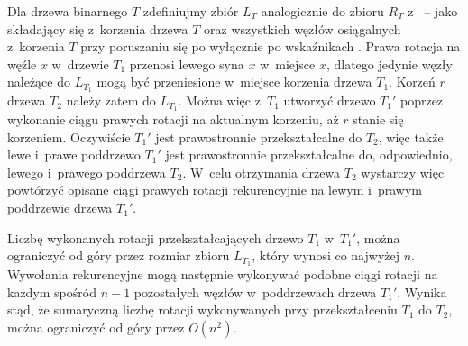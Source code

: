 Dla drzewa binarnego $T$ zdefiniujmy zbiór $L_T$ analogicznie do zbioru $R_T$ z~ -- jako składający się z~korzenia drzewa $T$ oraz wszystkich węzłów osiągalnych z~korzenia $T$ przy poruszaniu się po wyłącznie po wskaźnikach .
Prawa rotacja na węźle $x$ w~drzewie $T_1$ przenosi lewego syna $x$ w~miejsce $x$, dlatego jedynie węzły należące do $L_{T_1}$ mogą być przeniesione w~miejsce korzenia drzewa $T_1$.
Korzeń $r$ drzewa $T_2$ należy zatem do $L_{T_1}$.
Można więc z~$T_1$ utworzyć drzewo $T_1'$ poprzez wykonanie ciągu prawych rotacji na aktualnym korzeniu, aż $r$ stanie się korzeniem.
Oczywiście $T_1'$ jest prawostronnie przekształcalne do $T_2$, więc także lewe i~prawe poddrzewo $T_1'$ jest prawostronnie przekształcalne do, odpowiednio, lewego i~prawego poddrzewa $T_2$.
W~celu otrzymania drzewa $T_2$ wystarczy więc powtórzyć opisane ciągi prawych rotacji rekurencyjnie na lewym i~prawym poddrzewie drzewa $T_1'$.

Liczbę wykonanych rotacji przekształcających drzewo $T_1$ w~$T_1'$, można ograniczyć od góry przez rozmiar zbioru $L_{T_1}$, który wynosi co najwyżej $n$.
Wywołania rekurencyjne mogą następnie wykonywać podobne ciągi rotacji na każdym spośród $n-1$ pozostałych węzłów w~poddrzewach drzewa $T_1'$.
Wynika stąd, że sumaryczną liczbę rotacji wykonywanych przy przekształceniu $T_1$ do $T_2$, można ograniczyć od góry przez $O(n^2)$.
